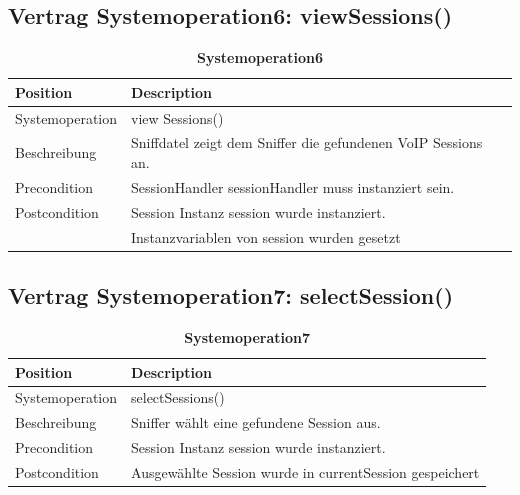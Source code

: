 \documentclass[a4,12pt]{scrartcl}
\begin{document}
\subsection{Vertrag Systemoperation6: viewSessions()}
\begin{table}[H]
\centering
    \begin{tabular}{@{} l l@{}}    
    {Position} & {Description}\\ \midrule
   	Systemoperation & view Sessions()\\ \addlinespace
   	Beschreibung & Sniffdatel zeigt dem Sniffer die gefundenen VoIP Sessions an. \\ \addlinespace
   	Precondition & SessionHandler sessionHandler muss instanziert sein.\\ \addlinespace
	Postcondition & Session Instanz session wurde instanziert. \\ \addlinespace
	& Instanzvariablen von session wurden gesetzt
	\\ \bottomrule
    \end{tabular}
\caption{\textbf{Systemoperation6}}
\end{table}
\subsection{Vertrag Systemoperation7: selectSession()}
\begin{table}[H]
\centering
    \begin{tabular}{@{} l l@{}}    
    {Position} & {Description}\\ \midrule
   	Systemoperation & selectSessions()\\ \addlinespace
   	Beschreibung & Sniffer wählt eine gefundene Session aus.\\ \addlinespace
   	Precondition & Session Instanz session wurde instanziert. \\ \addlinespace
	Postcondition & Ausgewählte Session wurde in currentSession gespeichert\\ \bottomrule
    \end{tabular}
\caption{\textbf{Systemoperation7}}
\end{table}
\end{document}
